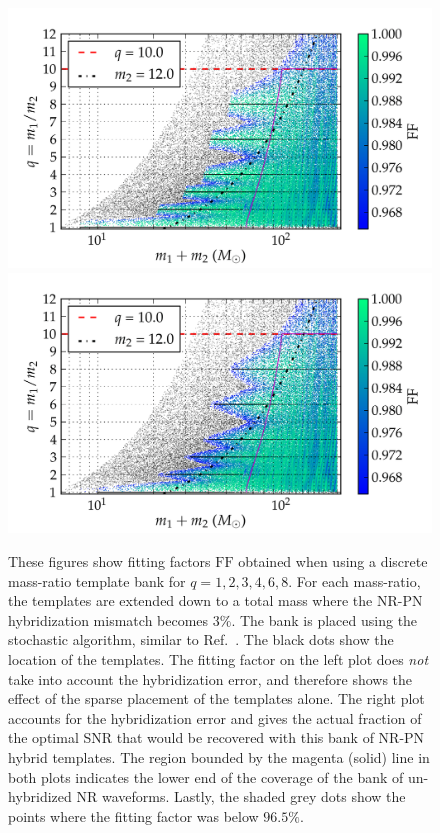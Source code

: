 \documentclass[aps,
prd,
twocolumn,
superscriptaddress,
lengthcheck,showpacs,letterpaper,nofootinbib,
floatfix]{revtex4-1}
\newcommand{\FF}{\mathrm{FF}}
\begin{document}
\begin{figure}
\begin{center}
\includegraphics[width=\columnwidth]{bank001_lowM_01_stochastic_mtot200_logMq_NOhybMM-tiny.png}
\includegraphics[width=\columnwidth]{bank001_lowM_01_stochastic_mtot200_logMq_hybMM-tiny.png}
\caption{\label{fig:Current-hybrids-stochastic-FF}These figures show fitting
  factors $\FF$ obtained when using a discrete mass-ratio template bank for
  $q=1,2,3,4,6,8$. For each mass-ratio, the templates are extended down 
  to a total mass where the NR-PN hybridization mismatch becomes
  $3\%$. The bank is placed using the stochastic algorithm, similar to 
  Ref.~\cite{Harry:2009ea,Ajith:2012mn,Manca:2009xw}. 
  The black dots show the location
  of the templates. The fitting factor on the left plot does 
  {\em not} take into account the hybridization error, and therefore shows the
  effect of the sparse placement of the templates alone. 
  The right plot accounts for the hybridization error
  and gives the actual fraction of the optimal SNR that would be recovered
  with this bank of NR-PN hybrid templates. The region bounded by the magenta 
  (solid) line in both plots indicates the lower end of the coverage of the 
  bank of un-hybridized NR waveforms. Lastly, the shaded grey dots show the 
  points where the fitting factor was below $96.5\%$.}
\end{center}
\end{figure}
\end{document}
